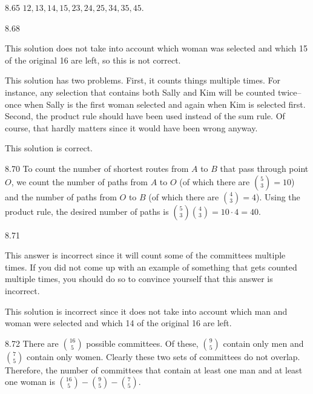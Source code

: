 \begin{Answer}{8.65}
$12, 13, 14, 15, 23, 24, 25, 34, 35, 45$.
\end{Answer}
\begin{Answer}{8.68}
\begin{solevalenum}
\item
This solution does not take into account which woman was selected
and which 15 of the original 16 are left, so this is not correct.
\item
This solution has two problems.  First, it counts things multiple times.  For instance,
any selection that contains both Sally and Kim will be counted twice--once
when Sally is the first woman selected and again when Kim is selected first.
Second, the product rule should have been used instead of the sum rule.  Of course, that
hardly matters since it would have been wrong anyway.
\item
This solution is correct.
\end{solevalenum}
\end{Answer}
\begin{Answer}{8.70}
To count the  number of shortest routes from $A$ to $B$
that pass through point $O$, we count the number of
paths from $A$ to $O$ (of which there are $\binom{5}{3} = 10$) and
the number of paths from $O$ to $B$ (of which there are
$\binom{4}{3} = 4$). Using the product rule,
the desired number of paths is
$\displaystyle\binom{5}{3}\binom{4}{3} = 10\cdot 4 = 40$.
\end{Answer}
\begin{Answer}{8.71}
\begin{solevalenum}
\item
This answer is incorrect since it will count some of the committees multiple times.
If you did not come up with an example of something that gets counted multiple times,
you should do so to convince yourself that this answer is incorrect.
\item
This solution is incorrect since it does not take into account which man and woman
were selected  and which 14 of the original 16 are left.
\end{solevalenum}
\end{Answer}
\begin{Answer}{8.72}
There are $\binom{16}{5}$ possible committees.  Of these, $\binom{9}{5}$  contain only men and
$\binom{7}{5}$ contain only women.
Clearly these two sets of committees do not overlap.
Therefore, the number of committees that contain at least one man and at least one woman is
$\binom{16}{5}-\binom{9}{5} -\binom{7}{5}$.
\end{Answer}
